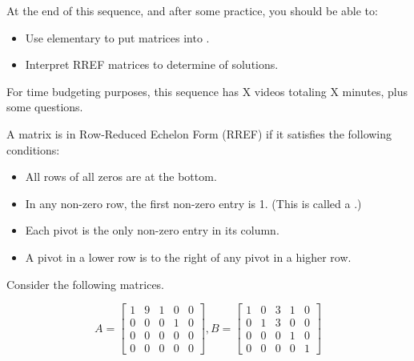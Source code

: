 







At the end of this sequence, and after some practice, you should be able to:

\begin{itemize}
\item Use elementary {} to put matrices into {}.
\item Interpret RREF matrices to determine {} of solutions.  
\end{itemize}


For time budgeting purposes, this sequence has X videos totaling X minutes, 
plus some questions.  




\endedxtext

\endedxvertical






\endedxvertical





{}  A matrix is in Row-Reduced Echelon Form (RREF) if it satisfies the following conditions:

\begin{itemize}
\item All rows of all zeros are at the bottom.
\item In any non-zero row, the first non-zero entry is 1.  (This is called a {}.) 
\item Each pivot is the only non-zero entry in its column.
\item A pivot in a lower row is to the right of any pivot in a higher row.  
\end{itemize}



\endedxtext



Consider the following matrices.

\[ 
A = \left[ \begin{array}{ccccc} 1 & 9 & 1 & 0 & 0 \\
0 & 0 & 0 & 1 & 0 \\
0 & 0 & 0 & 0 & 0 \\
0 & 0 & 0 & 0 & 0 
 \end{array} \right], 

B= \left[ \begin{array}{ccccc} 1 & 0 & 3 & 1 & 0 \\
0 & 1 & 3 & 0 & 0 \\
0 & 0 & 0 & 1 & 0 \\
0 & 0 & 0 & 0 & 1 
 \end{array} \right] \]
 
